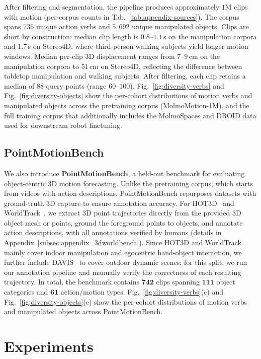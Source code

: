 \documentclass{llmxive}
\providecommand{\benchmarkname}{PointMotionBench\xspace}
\begin{document}
After filtering and segmentation, the pipeline produces approximately $1$M clips with motion (per-corpus counts in Tab.~\ref{tab:appendix-sources}). The corpus spans $736$ unique action verbs and $5{,}692$ unique manipulated objects. Clips are short by construction: median clip length is $0.8$--$1.1$\,s on the manipulation corpora and $1.7$\,s on Stereo4D, where third-person walking subjects yield longer motion windows. Median per-clip 3D displacement ranges from $7$--$9$\,cm on the manipulation corpora to $51$\,cm on Stereo4D, reflecting the difference between tabletop manipulation and walking subjects. After filtering, each clip retains a median of $88$ query points (range $60$--$100$). Fig.~\ref{fig:diversity-verbs} and Fig.~\ref{fig:diversity-objects} show the per-cohort distributions of motion verbs and manipulated objects across the pretraining corpus (MolmoMotion-1M), and the full training corpus that additionally includes the MolmoSpaces and DROID data used for downstream robot finetuning.




\subsection{\benchmarkname{}}
\label{subsec:data_and_benchmark}
We also introduce \textbf{\benchmarkname{}}, a held-out benchmark for evaluating object-centric 3D motion forecasting. Unlike the pretraining corpus, which starts from videos with action descriptions, \benchmarkname{} repurposes datasets with ground-truth 3D capture to ensure annotation accuracy. For HOT3D~\cite{hot3d} and WorldTrack~\cite{feng2025st4rtrack}, we extract 3D point trajectories directly from the provided 3D object mesh or points, ground the foreground points to objects, and annotate action descriptions, with all annotations verified by humans (details in Appendix~\ref{subsec:appendix_3dworldbench}). Since HOT3D and WorldTrack mainly cover indoor manipulation and egocentric hand-object interaction, we further include DAVIS~\cite{davis} to cover outdoor dynamic scenes; for this split, we run our annotation pipeline and manually verify the correctness of each resulting trajectory.
In total, the benchmark contains $\mathbf{742}$ clips spanning $\mathbf{111}$ object categories and $\mathbf{61}$ action/motion types. Fig.~\ref{fig:diversity-verbs}(c) and Fig.~\ref{fig:diversity-objects}(c) show the per-cohort distributions of motion verbs and manipulated objects across \benchmarkname{}.


\section{Experiments}
\label{sec:experiments}
\end{document}
